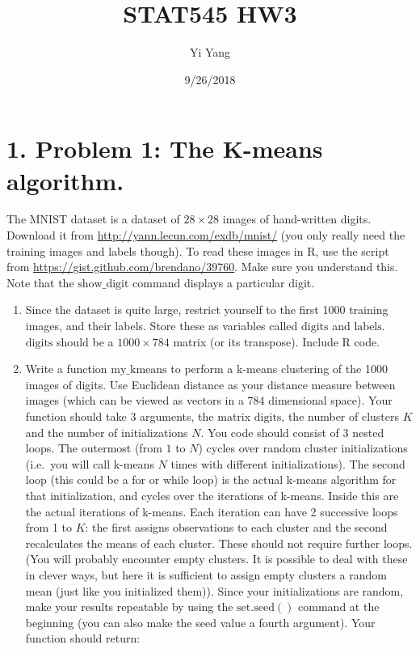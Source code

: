 \documentclass[]{article}
\title{STAT545 HW3}
\author{Yi Yang}
\date{9/26/2018}
\begin{document}
\maketitle

\section{1. Problem 1: The K-means
algorithm.}\label{problem-1-the-k-means-algorithm.}

The MNIST dataset is a dataset of \(28\times 28\) images of hand-written
digits. Download it from \url{http://yann.lecun.com/exdb/mnist/} (you
only really need the training images and labels though). To read these
images in R, use the script from
\url{https://gist.github.com/brendano/39760}. Make sure you understand
this. Note that the \(\mathrm{show\_digit}\) command displays a
particular digit.

\begin{enumerate}
\def\labelenumi{\arabic{enumi}.}
\item
  Since the dataset is quite large, restrict yourself to the first 1000
  training images, and their labels. Store these as variables called
  \(\mathrm{digits}\) and \(\mathrm{labels}\). \(\mathrm{digits}\)
  should be a \(1000\times 784\) matrix (or its transpose). Include R
  code.
\item
  Write a function \(\mathrm{my\_kmeans}\) to perform a k-means
  clustering of the 1000 images of digits. Use Euclidean distance as
  your distance measure between images (which can be viewed as vectors
  in a 784 dimensional space). Your function should take 3 arguments,
  the matrix \(\mathrm{digits}\), the number of clusters \(K\) and the
  number of initializations \(N\). You code should consist of 3 nested
  loops. The outermost (from \(1\) to \(N\)) cycles over random cluster
  initializations (i.e.~you will call k-means \(N\) times with different
  initializations). The second loop (this could be a for or while loop)
  is the actual k-means algorithm for that initialization, and cycles
  over the iterations of k-means. Inside this are the actual iterations
  of k-means. Each iteration can have 2 successive loops from 1 to
  \(K\): the first assigns observations to each cluster and the second
  recalculates the means of each cluster. These should not require
  further loops. (You will probably encounter empty clusters. It is
  possible to deal with these in clever ways, but here it is sufficient
  to assign empty clusters a random mean (just like you initialized
  them)). Since your initializations are random, make your results
  repeatable by using the \(\mathrm{set.seed()}\) command at the
  beginning (you can also make the seed value a fourth argument). Your
  function should return:
\end{enumerate}
\end{document}
